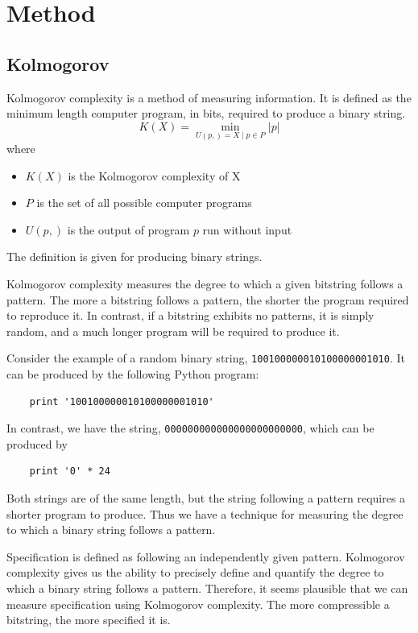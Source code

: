 \section{Method}

\subsection{Kolmogorov}

Kolmogorov complexity is a method of measuring information.
It is defined as the minimum length computer program, in bits, required to produce a binary string.
\begin{equation}
    K(X) = \min_{U(p,) = X \mid p \in P} |p|
\end{equation} where
\begin{itemize}
    \item $K(X)$ is the Kolmogorov complexity of X
    \item $P$ is the set of all possible computer programs
    \item $U(p,)$ is the output of program $p$ run without input
\end{itemize}
The definition is given for producing binary strings.

Kolmogorov complexity measures the degree to which a given bitstring follows a pattern.
The more a bitstring follows a pattern, the shorter the program required to reproduce it.
In contrast, if a bitstring exhibits no patterns, it is simply random, and a much longer program will be required to produce it.

Consider the example of a random binary string, {\tt 100100000010100000001010}.
It can be produced by the following Python program:
\begin{verbatim}
    print '100100000010100000001010'
\end{verbatim}
In contrast, we have the string, {\tt 000000000000000000000000}, which can be produced by
\begin{verbatim}
    print '0' * 24
\end{verbatim}
Both strings are of the same length, but the string following a pattern requires a shorter program to produce.
Thus we have a technique for measuring the degree to which a binary string follows a pattern.

Specification is defined as following an independently given pattern.
Kolmogorov complexity gives us the ability to precisely define and quantify the degree to which a binary string follows a pattern.
Therefore, it seems plausible that we can measure specification using Kolmogorov complexity.
The more compressible a bitstring, the more specified it is.

